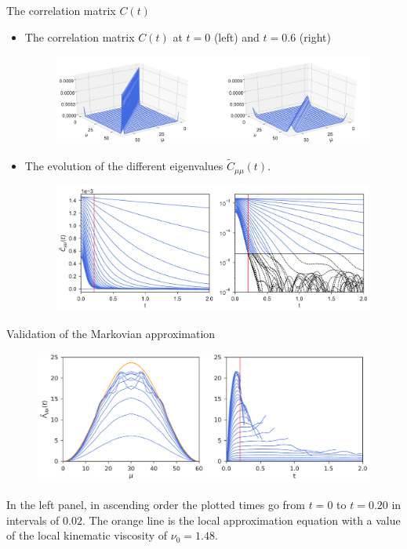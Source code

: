 \documentclass{beamer}
\begin{document}
 \begin{frame}{The correlation matrix $C(t)$}
   \begin{itemize}
 \item
   The correlation matrix $C(t)$ at $t=0$ (left) and $t=0.6$ (right)
\begin{figure}[h!]
\includegraphics[width=\linewidth]{Ct-matrix-PBC}
\end{figure}
\item  The evolution of the different eigenvalues $\tilde{C}_{\mu\mu}(t)$. %
\begin{figure}[h!]
  \includegraphics[width=\linewidth]{CtFourier-PBC-exp}
\end{figure}
\end{itemize}
\end{frame}

\begin{frame}{Validation of the Markovian approximation}
\begin{figure}[h!]
\includegraphics[width=\linewidth]{LambdatFourier-PBC}
\end{figure}
In  the left  panel, in
  ascending  order the  plotted times  go  from $t=0$  to $t=0.20$  in
  intervals of $0.02$.  The orange line is the local approximation equation
  with a  value of the local  kinematic viscosity of
  $\nu_0=1.48$.
 \end{frame}
\end{document}
